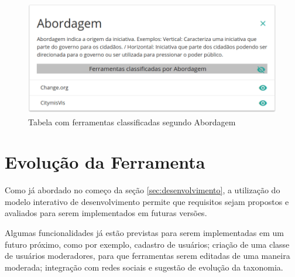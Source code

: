\begin{figure}[!ht]
    \centering
    \includegraphics[scale=0.20]{./figuras/abordagem.png}
    \caption{Tabela com ferramentas classificadas segundo Abordagem}
    \label{fig:tabela-ferramentas}
\end{figure}

\section{Evolução da Ferramenta}
\label{sec:evolucao-ferramenta}
Como já abordado no começo da seção \ref{sec:desenvolvimento}, a utilização do modelo interativo de desenvolvimento permite que requisitos sejam propostos e avaliados para serem
implementados em futuras versões.

\par
Algumas funcionalidades já estão previstas para serem implementadas em um futuro próximo, como por exemplo, cadastro de usuários; criação de uma classe de usuários moderadores,
para que ferramentas serem editadas de uma maneira moderada; integração com redes sociais e sugestão de evolução da taxonomia. 